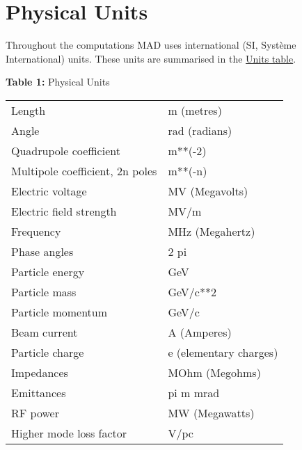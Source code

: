 
\section{Physical Units}

Throughout the computations MAD uses international (SI, Syst\`eme
International) units. These units are summarised in the
\hyperlink{table}{Units table}.  

\begin{table}[h]
\begin{center}
{\textbf{Table 1:} Physical Units}
\\
\begin{tabular}{l | l}
Length                  & m (metres) \\ 
Angle                   & rad (radians) \\ 
Quadrupole coefficient  & m**(-2) \\ 
Multipole coefficient, 2n poles   & m**(-n) \\ 
Electric voltage        & MV (Megavolts) \\ 
Electric field strength & MV/m \\ 
Frequency               & MHz (Megahertz) \\ 
Phase angles            & 2 pi \\ 
Particle energy         & GeV \\ 
Particle mass           & GeV/c**2 \\ 
Particle momentum       & GeV/c \\ 
Beam current            & A (Amperes) \\ 
Particle charge         & e (elementary charges) \\ 
Impedances              & MOhm (Megohms) \\ 
Emittances              & pi m mrad \\ 
RF power                & MW (Megawatts) \\ 
Higher mode loss factor & V/pc
\end{tabular}
\end{center}
\end{table}


